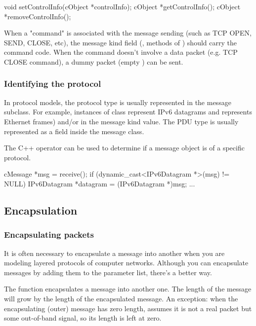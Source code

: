 \begin{cpp}
void setControlInfo(cObject *controlInfo);
cObject *getControlInfo();
cObject *removeControlInfo();
\end{cpp}

When a "command" is associated with the message sending (such as
TCP OPEN, SEND, CLOSE, etc), the message kind field (,
 methods of ) should carry the command code.
When the command doesn't involve a data packet (e.g.
TCP CLOSE command), a dummy packet (empty ) can be sent.



\subsubsection{Identifying the protocol}

In {\opp} protocol models, the protocol type is usually represented
in the message subclass. For example, instances of class
 represent IPv6 datagrams and 
represents Ethernet frames) and/or in the message kind value.
The PDU type is usually represented as a field inside the message class.

The C++  operator can be used to determine
if a message object is of a specific protocol.

\begin{cpp}
cMessage *msg = receive();
if (dynamic_cast<IPv6Datagram *>(msg) != NULL)
{
    IPv6Datagram *datagram = (IPv6Datagram *)msg;
    ...
}
\end{cpp}


\subsection{Encapsulation}

\subsubsection{Encapsulating packets}

It is often necessary to encapsulate a
message into another when you are modeling
layered protocols of computer networks. Although you can encapsulate
messages by adding them to the parameter list, there's a better way.


The  function encapsulates a message
into another one. The length of the message will grow by the length of
the encapsulated message. An exception: when the encapsulating (outer)
message has zero length, {\opp} assumes it is not a real packet but
some out-of-band signal, so its length is left at zero.

